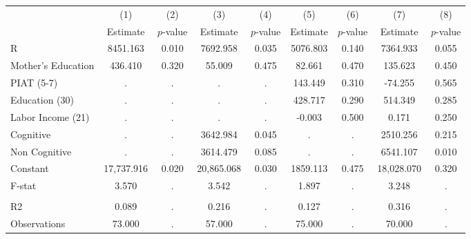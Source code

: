 \begin{tabular}{lcccccccc} \toprule
 & (1) & (2) & (3) & (4) & (5) & (6) & (7) & (8) \\ 
 & Estimate  & $p$-value  & Estimate  & $p$-value  & Estimate  & $p$-value  & Estimate  & $p$-value  \\  \midrule
R &  8451.163 &     0.010 &  7692.958 &     0.035 &  5076.803 &     0.140 &  7364.933 &     0.055 \\  
Mother's Education &   436.410 &     0.320 &    55.009 &     0.475 &    82.661 &     0.470 &   135.623 &     0.450 \\  
PIAT (5-7) &         . &         . &         . &         . &   143.449 &     0.310 &   -74.255 &     0.565 \\  
Education (30) &         . &         . &         . &         . &   428.717 &     0.290 &   514.349 &     0.285 \\  
Labor Income (21) &         . &         . &         . &         . &    -0.003 &     0.500 &     0.171 &     0.250 \\  
Cognitive &         . &         . &  3642.984 &     0.045 &         . &         . &  2510.256 &     0.215 \\  
Non Cognitive &         . &         . &  3614.479 &     0.085 &         . &         . &  6541.107 &     0.010 \\  
Constant & 17,737.916 &     0.020 & 20,865.068 &     0.030 &  1859.113 &     0.475 & 18,028.070 &     0.320 \\  
F-stat &     3.570 &         . &     3.542 &         . &     1.897 &         . &     3.248 &         . \\  \\ \midrule
R2 &     0.089 &         . &     0.216 &         . &     0.127 &         . &     0.316 &         . \\  
Observations &    73.000 &         . &    57.000 &         . &    75.000 &         . &    70.000 &         . \\  
\bottomrule \end{tabular}
